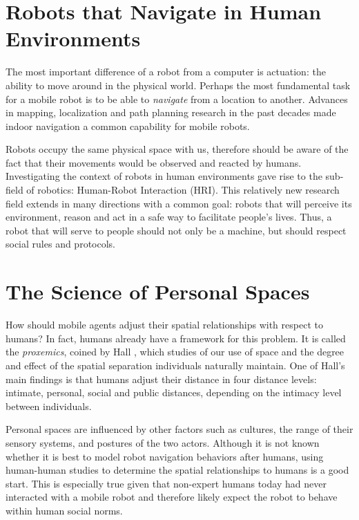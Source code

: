 \documentclass[12pt]{gatech-thesis}
\begin{document}
\section{Robots that Navigate in Human Environments}

The most important difference of a robot from a computer is actuation: the ability to move around in the physical world. Perhaps the most fundamental task for a mobile robot is to be able to \textit{navigate} from a location to another. Advances in mapping, localization and path planning research in the past decades made indoor navigation a common capability for mobile robots. 

Robots occupy the same physical space with us, therefore should be aware of the fact that their movements would be observed and reacted by humans. Investigating the context of robots in human environments gave rise to the sub-field of robotics: Human-Robot Interaction (HRI). This relatively new research field extends in many directions with a common goal: robots that will perceive its environment, reason and act in a safe way to facilitate people's lives. Thus, a robot that will serve to people should not only be a machine, but should respect social rules and protocols.

\section{The Science of Personal Spaces}
\label{sec:personal_spaces}

How should mobile agents adjust their spatial relationships with respect to humans? In fact, humans already have a framework for this problem. It is called the \textit{proxemics}, coined by Hall \cite{hall1966hidden}, which studies of our use of space and the degree and effect of the spatial separation individuals naturally maintain. One of Hall's main findings is that humans adjust their distance in four distance levels: intimate, personal, social and public distances, depending on the intimacy level between individuals.

Personal spaces are influenced by other factors such as cultures, the range of their sensory systems, and postures of the two actors. Although it is not known whether it is best to model robot navigation behaviors after humans, using human-human studies to determine the spatial relationships to humans is a good start. This is especially true given that non-expert humans today had never interacted with a mobile robot and therefore likely expect the robot to behave within human social norms.
\end{document}
